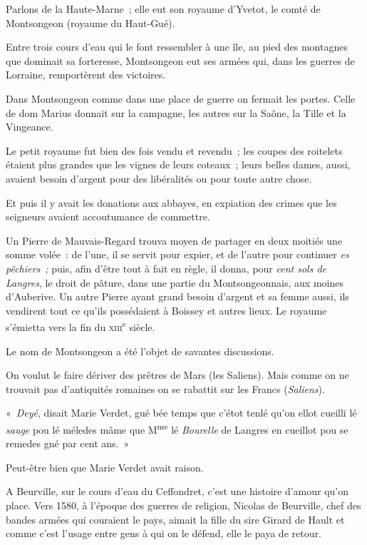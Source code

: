 \documentclass[french,twoside]{book} %
\newcommand{\astertri}{\medskip\par\centerline{\color{rubric}\large\selectfont{\syms ✻\,✻\,✻}}\medskip\par}%
\begin{document}
\astertri

\noindent Parlons de la Haute-Marne ; elle eut son royaume d’Yvetot, le comté de Montsongeon (royaume du Haut-Gué).\par
Entre trois cours d’eau qui le font ressembler à une île, au pied des montagnes que dominait sa forteresse, Montsongeon eut ses armées qui, dans les guerres de Lorraine, remportèrent des victoires.\par
Dans Montsongeon comme dans une place de guerre on fermait les portes. Celle de dom Marius donnait sur la campagne, les autres sur la Saône, la Tille et la Vingeance.\par
Le petit royaume fut bien des fois vendu et revendu ; les coupes des roitelets étaient plus grandes que les vignes de leurs coteaux ; leurs belles dames, aussi, avaient besoin d’argent pour des libéralités ou pour toute autre chose.\par
Et puis il y avait les donations aux abbayes, en expiation des crimes que les seigneurs avaient accoutumance de commettre.\par
Un Pierre de Mauvais-Regard trouva moyen de partager en deux moitiés une somme volée : de l’une, il se servit pour expier, et de l’autre pour continuer \emph{es pêchiers ;} puis, afin d’être tout à fait en règle, il donna, pour \emph{cent sols de Langres}, le droit de pâture, dans une partie du Montsongeonnais,  aux moines d’Auberive. Un autre Pierre ayant grand besoin d’argent et sa femme aussi, ils vendirent tout ce qu’ils possédaient à Boissey et autres lieux. Le royaume s’émietta vers la fin du {\scshape xiii}\textsuperscript{e} siècle.\par
Le nom de Montsongeon a été l’objet de savantes discussions.\par
On voulut le faire dériver des prêtres de Mars (les Saliens). Mais comme on ne trouvait pas d’antiquités romaines on se rabattit sur les Francs (\emph{Saliens}).\par
« \emph{Deyé}, disait Marie Verdet, gué bée temps que c’étot tenlé qu’on ellot cueilli lé \emph{sauge} pou lé méledes mâme que M\textsuperscript{me} lé \emph{Bourelle} de Langres en cueillot pou se remedes gné par cent ans. »\par
Peut-être bien que Marie Verdet avait raison.\par
A Beurville, sur le cours d’eau du Ceffondret, c’est une histoire d’amour qu’on place. Vers 1580, à l’époque des guerres de religion, Nicolas de Beurville, chef des bandes armées qui couraient le pays, aimait la fille du sire Girard de Hault et comme c’est l’usage entre gens à qui on le défend, elle le paya de retour.\par
\end{document}
